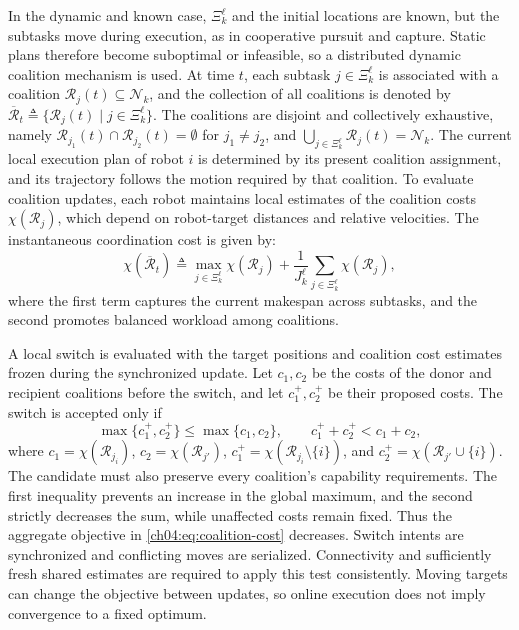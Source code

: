 In the dynamic and known case, $\Xi_k^\ell$ and the initial locations are known,
but the subtasks move during execution, as in cooperative pursuit and capture.
Static plans therefore become suboptimal or infeasible, so a distributed dynamic
coalition mechanism is used. At time
$t$, each subtask $j\in\Xi_k^\ell$ is associated with a coalition
$\mathcal{R}_j(t)\subseteq\mathcal{N}_k$, and the collection of all coalitions
is denoted by
$\overline{\mathcal{R}}_t \triangleq
\{\mathcal{R}_j(t)\mid j\in\Xi_k^\ell\}$.
The coalitions are disjoint and collectively exhaustive, namely
$\mathcal{R}_{j_1}(t)\cap\mathcal{R}_{j_2}(t)=\emptyset$ for
$j_1\neq j_2$, and
$\bigcup_{j\in\Xi_k^\ell}\mathcal{R}_j(t)=\mathcal{N}_k$. The current local
execution plan of robot $i$ is determined by its present coalition assignment,
and its trajectory follows the motion required by that coalition.
To evaluate coalition updates, each robot maintains local estimates of the
coalition costs $\chi(\mathcal{R}_j)$, which depend on robot-target distances
and relative velocities. The instantaneous coordination cost is given by:
\begin{equation}
\label{ch04:eq:coalition-cost}
\chi(\overline{\mathcal{R}}_t)\triangleq
\max_{j\in\Xi_k^\ell}\chi(\mathcal{R}_j)
+
\frac{1}{J_k^\ell}\sum_{j\in\Xi_k^\ell}\chi(\mathcal{R}_j),
\end{equation}
where the first term captures the current makespan across subtasks, and the
second promotes balanced workload among coalitions.

\begin{revision}
A local switch is evaluated with the target positions and coalition cost
estimates frozen during the synchronized update. Let $c_1,c_2$ be the
costs of the donor and recipient coalitions before the switch, and let
$c_1^+,c_2^+$ be their proposed costs. The switch is accepted only if
\begin{equation}
\label{ch04:eq:switch-condition}
\max\{c_1^+,c_2^+\}\le\max\{c_1,c_2\},\qquad
c_1^++c_2^+<c_1+c_2,
\end{equation}
where $c_1=\chi(\mathcal R_{j_i})$, $c_2=\chi(\mathcal R_{j'})$,
$c_1^+=\chi(\mathcal R_{j_i}\setminus\{i\})$, and
$c_2^+=\chi(\mathcal R_{j'}\cup\{i\})$.
The candidate must also preserve every coalition's capability requirements.
The first inequality prevents an increase in the global maximum, and the
second strictly decreases the sum, while unaffected costs remain fixed.
Thus the aggregate objective in \eqref{ch04:eq:coalition-cost} decreases.
Switch intents are synchronized and conflicting moves are serialized.
Connectivity and sufficiently fresh shared estimates are required to apply
this test consistently. Moving targets can change the objective between
updates, so online execution does not imply convergence to a fixed optimum.
\end{revision}

